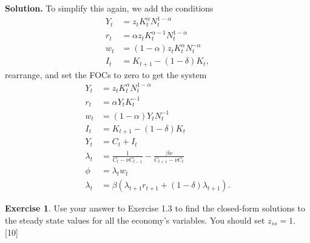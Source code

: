 \documentclass[11pt]{article}
\numberwithin{equation}{section} %
\numberwithin{figure}{section} %
\numberwithin{table}{section} %
\theoremstyle{definition}
\newtheorem{exercise}[theorem]{Exercise}
\newenvironment{solution}{\begin{addmargin}[2em]{0em} {\bf Solution. }}{\end{addmargin}}
\begin{document}
\begin{solution}
    To simplify this again, we add the conditions
    \begin{align*}
        Y_t &= z_t K_t^\alpha N_t^{1-\alpha} \\
        r_t &= \alpha z_t K_t^{\alpha - 1} N_t^{1 - \alpha} \\
        w_t &= (1 - \alpha) z_t K_t^\alpha N_t^{-\alpha} \\
        I_t &= K_{t + 1} - (1 - \delta) K_t,
    \end{align*}
    rearrange, and set the FOCs to zero to get the system
    \begin{align*}
        Y_t &= z_t K_t^\alpha N_t^{1-\alpha} \\
        r_t &= \alpha Y_t K_t^{-1} \\
        w_t &= (1 - \alpha) Y_t N_t^{-1} \\
        I_t &= K_{t + 1} - (1 - \delta) K_t \\
        Y_t &= C_t + I_t \\
        \lambda_t &= \frac{1}{C_t - \nu C_{t-1}} - \frac{\beta \nu}{C_{t+1} - \nu C_t} \\
        \phi &= \lambda_t w_t \\
        \lambda_t &= \beta (\lambda_{t+1} r_{t+1} + (1-\delta) \lambda_{t+1}).
    \end{align*} 
\end{solution}


\begin{exercise}
    Use your answer to Exercise 1.3 to find the closed-form solutions to the steady state values for all the economy's variables. You should set $z_{ss} = 1$. [10]
\end{exercise}
\end{document}
